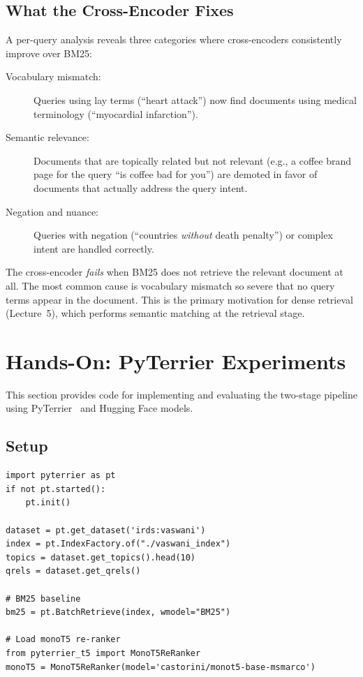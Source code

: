 \documentclass[11pt,a4paper]{article}
\theoremstyle{definition}
\theoremstyle{plain}
\begin{document}
\subsection{What the Cross-Encoder Fixes}

A per-query analysis reveals three categories where cross-encoders consistently improve over BM25:

\begin{description}
    \item[Vocabulary mismatch:] Queries using lay terms (``heart attack'') now find documents using medical terminology (``myocardial infarction'').
    
    \item[Semantic relevance:] Documents that are topically related but not relevant (e.g., a coffee brand page for the query ``is coffee bad for you'') are demoted in favor of documents that actually address the query intent.
    
    \item[Negation and nuance:] Queries with negation (``countries \emph{without} death penalty'') or complex intent are handled correctly.
\end{description}

\begin{pitfall}
The cross-encoder \emph{fails} when BM25 does not retrieve the relevant document at all. The most common cause is vocabulary mismatch so severe that no query terms appear in the document. This is the primary motivation for dense retrieval (Lecture~5), which performs semantic matching at the retrieval stage.
\end{pitfall}


\section{Hands-On: PyTerrier Experiments}
\label{sec:pyterrier}

This section provides code for implementing and evaluating the two-stage pipeline using PyTerrier~\cite{macdonald2021pyterrier} and Hugging Face models.

\subsection{Setup}

\begin{lstlisting}
import pyterrier as pt
if not pt.started():
    pt.init()

dataset = pt.get_dataset('irds:vaswani')
index = pt.IndexFactory.of("./vaswani_index")
topics = dataset.get_topics().head(10)
qrels = dataset.get_qrels()

# BM25 baseline
bm25 = pt.BatchRetrieve(index, wmodel="BM25")

# Load monoT5 re-ranker
from pyterrier_t5 import MonoT5ReRanker
monoT5 = MonoT5ReRanker(model='castorini/monot5-base-msmarco')
\end{lstlisting}
\end{document}
